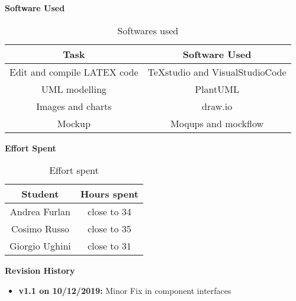 \begin{flushleft}
\textbf{Software Used}
\end{flushleft}
\begin{table}[htp]
	\centering
		\begin{tabular}{|c|c|}
			\hline
			Task&Software Used\\
			\hline
			Edit and compile LATEX code&TeXstudio and VisualStudioCode\\
			\hline
			UML modelling&PlantUML\\
			\hline
			Images and charts&draw.io\\
			\hline
			Mockup&Moqups and mockflow\\
			\hline
		\end{tabular}
	\caption{Softwares used} 
\end{table}
\begin{flushleft}
\textbf{Effort Spent}
\end{flushleft}
\begin{table}[htp]
	\centering
		\begin{tabular}{|c|c|}
			\hline
			Student&Hours spent\\
			\hline
			Andrea Furlan&close to 34\\
			\hline
			Cosimo Russo&close to 35\\
			\hline
			Giorgio Ughini&close to 31\\
			\hline
		\end{tabular}
	\caption{Effort spent} 
\end{table}

\begin{flushleft}
	\textbf{Revision History}
\end{flushleft}
\begin{itemize}
	\item \textbf{v1.1 on 10/12/2019:} Minor Fix in component interfaces
\end{itemize}